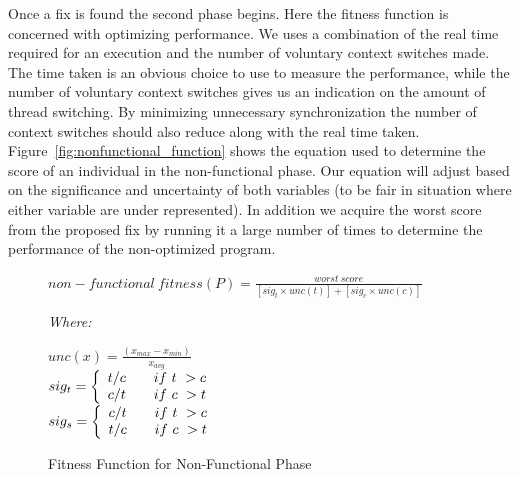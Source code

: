 \documentclass[10pt, conference, compsocconf]{IEEEtran}
\begin{document}
Once a fix is found the second phase begins.  Here the fitness function is
concerned with optimizing performance.  We uses a combination of the real time
required for an execution and the number of voluntary context switches made.
The time taken is an obvious choice to use to measure the performance, while
the number of voluntary context switches gives us an indication on the amount
of thread switching. By minimizing unnecessary synchronization the number of
context switches should also reduce along with the real time taken.
Figure~\ref{fig:nonfunctional_function} shows the equation used to determine
the score of an individual in the non-functional phase. Our equation will
adjust based on the significance and uncertainty of both variables (to be fair
in situation where either variable are under represented). In addition we
acquire the worst score from the proposed fix by running it a large number of
times to determine the performance of the non-optimized program.

\begin{figure}
\begin{footnotesize}
\begin{center}
$non-functional\ fitness(P) = \frac{worst\ score}{[sig_t \times unc(t)] + [sig_c \times unc(c)]}$
\end{center}
\vspace{0.1cm} \textit{Where:} \vspace{0.1cm}
\end{footnotesize}
\begin{tiny}
\begin{center}
$unc(x) = \frac{(x_{max} - x_{min})}{x_{avg}}$ \\ \vspace{0.2cm}
$
  sig_t = \left\{
  \begin{array}{l l}
    t/c & \quad if\ t\ > c \\
    c/t & \quad if\ c\ > t \\
  \end{array} \right.
$ \\ \vspace{0.2cm}
$
  sig_s = \left\{
  \begin{array}{l l}
    c/t & \quad if\ t\ > c \\
    t/c & \quad if\ c\ > t \\
  \end{array} \right.
$ \\
\end{center}
\end{tiny}
\caption{Fitness Function for Non-Functional Phase}
\label{fig:nonfunctional_fitness}
\end{figure}
\end{document}
